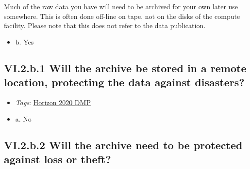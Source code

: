 \documentclass[a4paper,12pt]{report}
\begin{document}
\noindent
\begin{markdown}
Much of the raw data you have will need to be archived for your own later use somewhere. This is often done off-line on tape, not on the disks of the compute facility. Please note that this does not refer to the data publication.
\end{markdown}



\begin{itemize}
  \item[\CheckmarkBold] b. Yes
\end{itemize}




\subsection*{\protect\textcolor{colorSecId}{VI.2.b.1} Will the archive be stored in a remote location, protecting the data against disasters?}

\label{d5b27482-b598-4b8c-b534-417d4ad27394.d5784d24-0e66-4821-bd62-a711fb6d7a40.e81599af-4519-4987-b74e-9545428ed0e3.41a8d19b-2468-4c60-9f5e-7a8fee26eedb}


\begin{itemize}
  \item \textit{Tags}: \ul{Horizon 2020 DMP}
  \end{itemize}




\begin{itemize}
  \item[\CheckmarkBold] a. No
\end{itemize}




\subsection*{\protect\textcolor{colorSecId}{VI.2.b.2} Will the archive need to be protected against loss or theft?}

\label{d5b27482-b598-4b8c-b534-417d4ad27394.d5784d24-0e66-4821-bd62-a711fb6d7a40.e81599af-4519-4987-b74e-9545428ed0e3.ed3d43ad-d2b5-4194-8b05-08c95da0a7f2}
\end{document}

